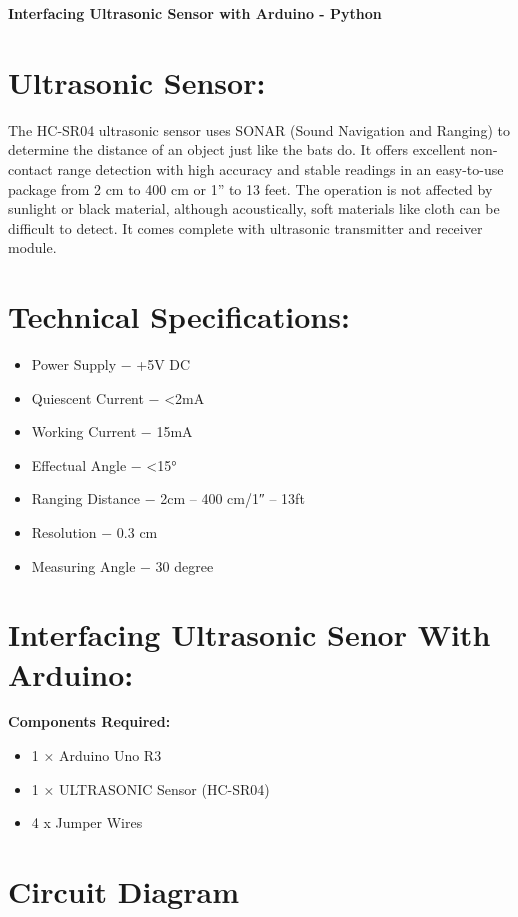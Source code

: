 \begin{center}
    \bfseries Interfacing Ultrasonic Sensor with Arduino - Python
\end{center}
\section{Ultrasonic Sensor:}
The HC-SR04 ultrasonic sensor uses SONAR (Sound Navigation and Ranging) to determine the distance of an object just like the bats do. It offers excellent non-contact range 
detection with high accuracy and stable readings in an easy-to-use package from 2 cm to 400 cm or 1” to 13 feet. The operation is not affected by sunlight or black material, although acoustically, soft materials like cloth can be difficult to detect. It comes complete with ultrasonic transmitter and receiver module.


\section{Technical Specifications:}
\begin{itemize}
\item Power Supply − +5V DC
\item Quiescent Current − <2mA
\item Working Current − 15mA
\item Effectual Angle − <15°
\item Ranging Distance − 2cm – 400 cm/1″ – 13ft
\item Resolution − 0.3 cm
\item Measuring Angle − 30 degree

\end{itemize}

\vspace{1cm}
\section{Interfacing Ultrasonic Senor With Arduino:}
\textbf{Components Required:}
\begin{itemize}
\item 1 × Arduino Uno R3
\item 1 × ULTRASONIC Sensor (HC-SR04)
\item 4 x Jumper Wires
\end{itemize}


\section{Circuit Diagram}

